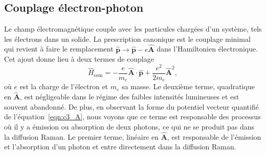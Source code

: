 \subsection{Couplage électron-photon}
Le champ électromagnétique couple avec les particules chargées d'un système, tels les électrons dans un solide. La prescription canonique est le couplage minimal qui revient à faire le remplacement $\hat{\mathbf{p}}\rightarrow \hat{\mathbf{p}}-e\hat{\mathbf{A}}$ dans l'Hamiltonien électronique. Cet ajout donne lieu à deux termes de couplage
\begin{equation}
    \hat{H}_\text{eem}=-\frac{e}{m_e}\hat{\mathbf{A}}\cdot\hat{\mathbf{p}}+\frac{e^2}{2m_e}\hat{\mathbf{A}}^2,
\end{equation}
où $e$ est la charge de l'électron et $m_e$ sa masse. Le deuxième terme, quadratique en $\hat{\mathbf{A}}$, est négligeable dans le régime des faibles intensités lumineuses et est souvent abandonné. De plus, en observant la forme du potentiel vecteur quantifié de l'équation~\eqref{eqn:c3_A}, nous voyons que ce terme est responsable des processus où il y a émission ou absorption de deux photons, ce qui ne se produit pas dans la diffusion Raman. Le premier terme, linéaire en $\hat{\mathbf{A}}$, est responsable de l'émission et l'absorption d'un photon et entre directement dans la diffusion Raman.

